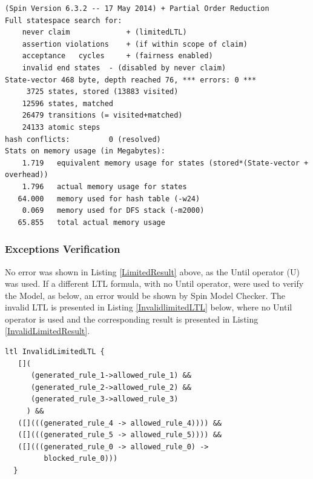 \singlespacing
\begin{lstlisting}[caption=Limited Bolt-on-Rules Plan Verification,
  label=LimitedResult]
(Spin Version 6.3.2 -- 17 May 2014) + Partial Order Reduction
Full statespace search for:
	never claim         	+ (limitedLTL)
	assertion violations	+ (if within scope of claim)
	acceptance   cycles 	+ (fairness enabled)
	invalid end states	- (disabled by never claim)
State-vector 468 byte, depth reached 76, *** errors: 0 ***
     3725 states, stored (13883 visited)
    12596 states, matched
    26479 transitions (= visited+matched)
    24133 atomic steps
hash conflicts:         0 (resolved)
Stats on memory usage (in Megabytes):
    1.719	equivalent memory usage for states (stored*(State-vector + overhead))
    1.796	actual memory usage for states
   64.000	memory used for hash table (-w24)
    0.069	memory used for DFS stack (-m2000)
   65.855	total actual memory usage
\end{lstlisting}
\doublespacing

\subsubsection{Exceptions Verification}
\noindent No error was shown in Listing \ref{LimitedResult} above, as the Until operator (U) was used. If a different LTL formula, with no Until operator, were used to verify the Model, as below, an error would be shown by Spin Model Checker. The invalid LTL is presented in Listing \ref{InvalidlimitedLTL} below, where no Until operator is used and the corresponding result is presented in Listing \ref{InvalidLimitedResult}.   \\

\singlespacing
\begin{lstlisting}[caption=Invalid Limited Bolt-on Rules LTL,
  label=InvalidlimitedLTL]
  ltl InvalidLimitedLTL {
   []( 
      (generated_rule_1->allowed_rule_1) &&
      (generated_rule_2->allowed_rule_2) &&
      (generated_rule_3->allowed_rule_3)
     ) &&
   ([](((generated_rule_4 -> allowed_rule_4)))) &&
   ([](((generated_rule_5 -> allowed_rule_5)))) &&
   ([](((generated_rule_0 -> allowed_rule_0) -> 
         blocked_rule_0)))
  }
\end{lstlisting}
\doublespacing

